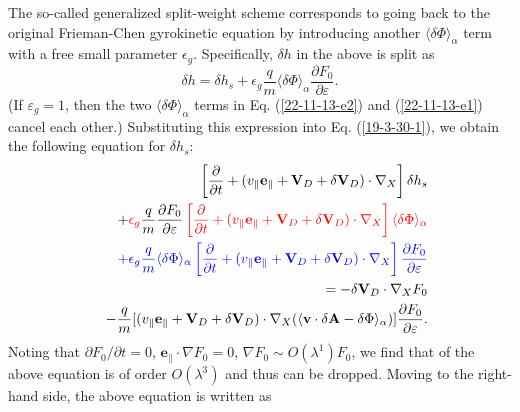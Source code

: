 \documentclass{article}
\newcommand{\tmcolor}[2]{{\color{#1}{#2}}}
\begin{document}
The so-called generalized split-weight scheme corresponds to going back to the
original Frieman-Chen gyrokinetic equation by introducing another $\langle
\delta \Phi \rangle_{\alpha}$ term with a free small parameter $\epsilon_g$.
Specifically, $\delta h$ in the above is split as
\begin{equation}
  \label{22-11-13-e1} \delta h = \delta h_s + \epsilon_g \frac{q}{m} \langle
  \delta \Phi \rangle_{\alpha} \frac{\partial F_0}{\partial \varepsilon} .
\end{equation}
(If $\varepsilon_g = 1$, then the two $\langle \delta \Phi \rangle_{\alpha}$
terms in Eq. (\ref{22-11-13-e2}) and (\ref{22-11-13-e1}) cancel each other.)
Substituting this expression into Eq. (\ref{19-3-30-1}), we obtain the
following equation for $\delta h_s$:
\begin{eqnarray}
  &  & \left[ \frac{\partial}{\partial t} + (v_{\parallel}
  \mathbf{e}_{\parallel} +\mathbf{V}_D + \delta \mathbf{V}_D) \cdot \nabla_X
  \right] \delta h_s \nonumber\\
  &  & + \tmcolor{red}{\epsilon_g \tmcolor{black}{\frac{q}{m} \frac{\partial
  F_0}{\partial \varepsilon}} \left[ \frac{\partial}{\partial t} +
  (v_{\parallel} \mathbf{e}_{\parallel} +\mathbf{V}_D + \delta \mathbf{V}_D)
  \cdot \nabla_X \right] \langle \delta \Phi \rangle_{\alpha}} \nonumber\\
  &  & \tmcolor{blue}{+ \epsilon_g \frac{q}{m} \langle \delta \Phi
  \rangle_{\alpha} \left[ \frac{\partial}{\partial t} + (v_{\parallel}
  \mathbf{e}_{\parallel} +\mathbf{V}_D + \delta \mathbf{V}_D) \cdot \nabla_X
  \right] \frac{\partial F_0}{\partial \varepsilon}} \nonumber\\
  &  & = - \delta \mathbf{V}_D \cdot \nabla_X F_0 \nonumber\\
  &  & - \frac{q}{m} [(v_{\parallel} \mathbf{e}_{\parallel} +\mathbf{V}_D +
  \delta \mathbf{V}_D) \cdot \nabla_X (\langle \mathbf{v} \cdot \delta
  \mathbf{A}- \delta \Phi \rangle_{\alpha})] \frac{\partial F_0}{\partial
  \varepsilon} .  \label{19-1-10-7m}
\end{eqnarray}
Noting that $\partial F_0 / \partial t = 0$, $\mathbf{e}_{\parallel} \cdot
\nabla F_0 = 0$, $\nabla F_0 \sim O (\lambda^1) F_0$, we find that
\tmcolor{blue}{the third line} of the above equation is of order $O
(\lambda^3)$ and thus can be dropped. Moving \tmcolor{red}{the second line} to
the right-hand side, the above equation is written as
\end{document}
